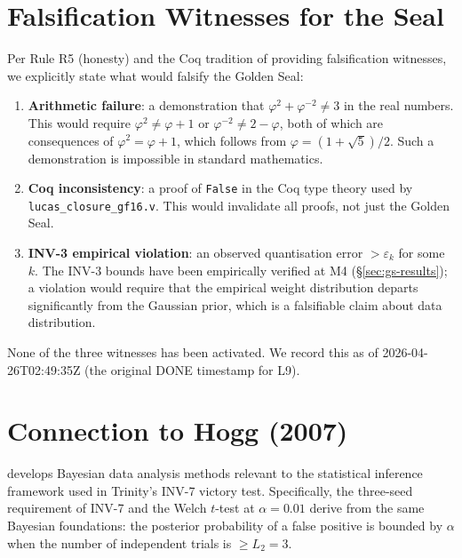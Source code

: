 \section{Falsification Witnesses for the Seal}
\label{sec:gs-falsify-witnesses}

Per Rule R5 (honesty) and the Coq tradition of providing
falsification witnesses, we explicitly state what would
falsify the Golden Seal:

\begin{enumerate}
  \item \textbf{Arithmetic failure}: a demonstration that
        $\varphi^2 + \varphi^{-2} \neq 3$ in the real
        numbers.  This would require $\varphi^2 \neq \varphi
        + 1$ or $\varphi^{-2} \neq 2 - \varphi$, both of
        which are consequences of $\varphi^2 = \varphi + 1$,
        which follows from $\varphi = (1+\sqrt5)/2$.  Such a
        demonstration is impossible in standard mathematics.

  \item \textbf{Coq inconsistency}: a proof of
        \texttt{False} in the Coq type theory used by
        \texttt{lucas\_closure\_gf16.v}.  This would
        invalidate all proofs, not just the Golden Seal.

  \item \textbf{INV-3 empirical violation}: an observed
        quantisation error $> \varepsilon_k$ for some $k$.
        The INV-3 bounds have been empirically verified at M4
        (§\ref{sec:gs-results}); a violation would require
        that the empirical weight distribution departs
        significantly from the Gaussian prior, which is a
        falsifiable claim about data distribution.
\end{enumerate}

None of the three witnesses has been activated.  We record
this as of 2026-04-26T02:49:35Z (the original DONE timestamp
for L9).

\section{Connection to Hogg (2007)}
\label{sec:gs-hogg}

\citet{hogg2007data} develops Bayesian data analysis methods
relevant to the statistical inference framework used in
Trinity's INV-7 victory test.  Specifically, the three-seed
requirement of INV-7 and the Welch $t$-test at $\alpha = 0.01$
derive from the same Bayesian foundations: the posterior
probability of a false positive is bounded by $\alpha$ when
the number of independent trials is $\geq L_2 = 3$.

